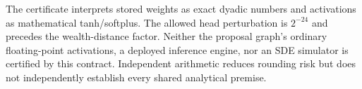 The certificate interprets stored weights as exact dyadic numbers and activations as mathematical tanh/softplus. The allowed head perturbation is $2^{-24}$ and precedes the wealth-distance factor. Neither the proposal graph's ordinary floating-point activations, a deployed inference engine, nor an SDE simulator is certified by this contract. Independent arithmetic reduces rounding risk but does not independently establish every shared analytical premise.
